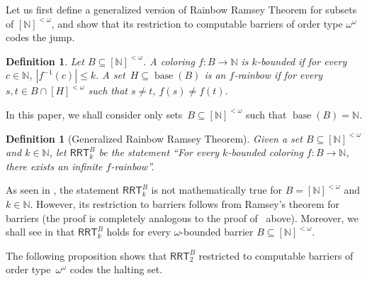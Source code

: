 \documentclass{article}
\newcommand{\RRT}[0]{\mathsf{RRT}}
\newcommand{\NN}[0]{\mathbb{N}}
\newcommand{\base}{\operatorname{base}}
\def\qt#1{``#1''}%
\numberwithin{theorem}{section}
\newtheorem{definition}[theorem]{Definition}
\newcommand{\ludovic}[1]{\textcolor{blue}{#1}}
\newcommand{\quentin}[1]{\textcolor{green}{#1}}
\newcommand{\lorenzo}[1]{\textcolor{orange}{#1}}
\begin{document}
Let us first define a generalized version of Rainbow Ramsey Theorem for subsets of $[\NN]^{<\omega}$, and show that its restriction to computable barriers of order type $\omega^\omega$ codes the jump.

\begin{definition}
Let $B \subseteq [\NN]^{<\omega}$.
A coloring $f : B \to \NN$ is \emph{$k$-bounded} if for every~$c \in \NN$, $|f^{-1}(c)| \leq k$.
A set~$H \subseteq \base(B)$ is an \emph{$f$-rainbow} if for every~$s, t \in B \cap [H]^{<\omega}$ such that $s \neq t$, $f(s) \neq f(t)$.
\end{definition}

In this paper, we shall consider only sets~$B\subseteq [\NN]^{<\omega}$ such that $\base(B) = \NN$.


\begin{definition}[Generalized Rainbow Ramsey Theorem]
Given a set $B \subseteq [\NN]^{<\omega}$ and $k \in \NN$, let $\RRT^B_k$ be the statement \qt{For every $k$-bounded coloring $f : B \to \NN$, there exists an infinite $f$-rainbow}.    
\end{definition}

As seen in , the statement $\RRT^B_k$ is not mathematically true for $B = [\NN]^{<\omega}$ and $k\in \NN$. However, its restriction to barriers follows from Ramsey's theorem for barriers (the proof is completely analogous to the proof of~ above). Moreover, we shall see in  that $\RRT^B_k$ holds for every $\omega$-bounded barrier $B \subseteq [\NN]^{<\omega}$.

The following proposition shows that $\RRT^B_2$ restricted to computable barriers of order type~$\omega^\omega$ codes the halting set.
\end{document}
